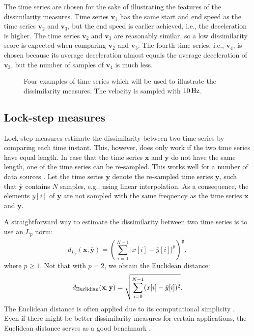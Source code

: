 \documentclass[10pt,final,a4paper,oneside,onecolumn]{article}
\newlength\figurewidth
\newlength\figureheight
\newcommand{\deuclid}{d_{\textup{Euclidian}}}
\newcommand{\profile}[1]{\textbf{v}_{#1}}
\theoremstyle{plain}\newtheorem{definition}{Definition}[section]    %
\theoremstyle{definition}\newtheorem{example}{Example}[section]     %
\theoremstyle{remark}\newtheorem{remarkenv}{Remark}[section]        %
\begin{document}
The time series are chosen for the sake of illustrating the features of the dissimilarity measures. Time series $\profile{1}$ has the same start and end speed as the time series $\profile{2}$ and $\profile{3}$, but the end speed is earlier achieved, i.e., the deceleration is higher. The time series $\profile{2}$ and $\profile{3}$ are reasonably similar, so a low dissimilarity score is expected when comparing $\profile{2}$ and $\profile{3}$. The fourth time series, i.e., $\profile{4}$, is chosen because its average deceleration almost equals the average deceleration of $\profile{3}$, but the number of samples of $\profile{4}$ is much less.

\begin{figure}
	\centering
	\setlength{}
	\setlength{}
	
	\caption{Four examples of time series which will be used to illustrate the dissimilarity measures. The velocity is sampled with $\unit[10]{Hz}$.}
	\label{fig:example time series}
\end{figure}

\subsection{Lock-step measures}
\label{sec:lock step}

Lock-step measures estimate the dissimilarity between two time series by comparing each time instant. This, however, does only work if the two time series have equal length. In case that the time series $\textbf{x}$ and $\textbf{y}$ do not have the same length, one of the time series can be re-sampled. This works well for a number of data sources \cite{keogh2003survey}. Let the time series $\bar{\textbf{y}}$ denote the re-sampled time series $\textbf{y}$, such that $\bar{\textbf{y}}$ contains $N$ samples, e.g., using linear interpolation. As a consequence, the elements $\bar{y}[i]$ of $\bar{\textbf{y}}$ are not sampled with the same frequency as the time series $\textbf{x}$ and $\textbf{y}$. 

A straightforward way to estimate the dissimilarity between two time series is to use an $L_p$ norm:
\begin{equation} \label{eq:lp norm}
	d_{L_p}(\textbf{x}, \bar{\textbf{y}}) = \left( \sum_{i=0}^{N-1} |x[i] - \bar{y}[i]|^p \right)^{\frac{1}{p}},
\end{equation}
where $p \geq 1$. Not that with $p=2$, we obtain the Euclidean distance:
\begin{equation} \label{eq:euclidian}
	\deuclid(\textbf{x}, \bar{\textbf{y}}) = \sqrt{\sum_{i=0}^{N-1} (x[i] - \bar{y}[i])^2}.
\end{equation}
The Euclidean distance is often applied due to its computational simplicity \cite{xing2010survey}. Even if there might be better dissimilarity measures for certain applications, the Euclidean distance serves as a good benchmark \cite{keogh2003survey}.
\end{document}
